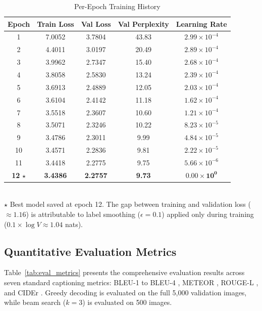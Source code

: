 \documentclass[conference]{IEEEtran}
\begin{document}
\begin{table}[htbp]
\caption{Per-Epoch Training History}
\label{tab:training_history}
\centering
\small
\begin{tabular}{@{}ccccc@{}}
\toprule
\textbf{Epoch} & \textbf{Train Loss} & \textbf{Val Loss} & \textbf{Val Perplexity} & \textbf{Learning Rate} \\
\midrule
1 & 7.0052 & 3.7804 & 43.83 & $2.99 \times 10^{-4}$ \\
2 & 4.4011 & 3.0197 & 20.49 & $2.89 \times 10^{-4}$ \\
3 & 3.9962 & 2.7347 & 15.40 & $2.68 \times 10^{-4}$ \\
4 & 3.8058 & 2.5830 & 13.24 & $2.39 \times 10^{-4}$ \\
5 & 3.6913 & 2.4889 & 12.05 & $2.03 \times 10^{-4}$ \\
6 & 3.6104 & 2.4142 & 11.18 & $1.62 \times 10^{-4}$ \\
7 & 3.5518 & 2.3607 & 10.60 & $1.21 \times 10^{-4}$ \\
8 & 3.5071 & 2.3246 & 10.22 & $8.23 \times 10^{-5}$ \\
9 & 3.4786 & 2.3011 & 9.99 & $4.84 \times 10^{-5}$ \\
10 & 3.4571 & 2.2836 & 9.81 & $2.22 \times 10^{-5}$ \\
11 & 3.4418 & 2.2775 & 9.75 & $5.66 \times 10^{-6}$ \\
\textbf{12} $\star$ & \textbf{3.4386} & \textbf{2.2757} & \textbf{9.73} & $\mathbf{0.00 \times 10^{0}}$ \\
\bottomrule
\end{tabular}
\vspace{1ex}\\
\footnotesize $\star$ Best model saved at epoch 12. The gap between training and validation loss ($\approx 1.16$) is attributable to label smoothing ($\epsilon=0.1$) applied only during training ($0.1 \times \log V \approx 1.04$ nats).
\end{table}

\subsection{Quantitative Evaluation Metrics}
Table~\ref{tab:eval_metrics} presents the comprehensive evaluation results across seven standard captioning metrics: BLEU-1 to BLEU-4 \cite{papineni2002bleu}, METEOR \cite{banerjee2005meteor}, ROUGE-L \cite{lin2004rouge}, and CIDEr \cite{vedantam2015cider}. Greedy decoding is evaluated on the full 5,000 validation images, while beam search ($k=3$) is evaluated on 500 images.
\end{document}
